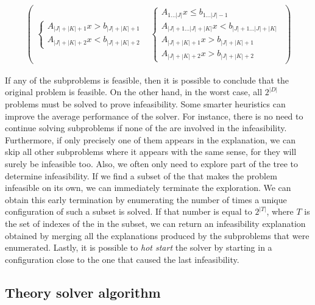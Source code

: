 \documentclass[runningheads]{llncs}
\begin{document}
\begin{equation}
\begin{gathered}
\begin{pmatrix}
\begin{cases}
                A_{|J| + |K| + 1} x > b_{|J| + |K| + 1}                   \\
                A_{|J| + |K| + 2} x < b_{|J| + |K| + 2}
            \end{cases}
             &
            \begin{cases}
                A_{1 \dots |J|} x \le b_{1 \dots |J| - 1}                 \\
                A_{|J| + 1\dots |J| + |K|} x < b_{|J| + 1\dots |J| + |K|} \\
                A_{|J| + |K| + 1} x > b_{|J| + |K| + 1}                   \\
                A_{|J| + |K| + 2} x > b_{|J| + |K| + 2}
            \end{cases}
        \end{pmatrix}
    \end{gathered}
\end{equation}

If any of the subproblems is feasible, then it is possible to conclude that the original problem is feasible.
On the other hand, in the worst case, all $2^{|D|}$ problems must be solved to prove infeasibility.
Some smarter heuristics can improve the average performance of the solver.
For instance, there is no need to continue solving subproblems if none of the \nqcs are involved in the infeasibility.
Furthermore, if only precisely one of them appears in the explanation, we can skip all other subproblems where it appears with the same sense, for they will surely be infeasible too.
Also, we often only need to explore part of the tree to determine infeasibility.
If we find a subset of the \nqc that makes the problem infeasible on its own, we can immediately terminate the exploration.
We can obtain this early termination by enumerating the number of times a unique configuration of such a subset is solved.
If that number is equal to $2^{|T|}$, where $T$ is the set of indexes of the \nqcs in the subset, we can return an infeasibility explanation obtained by merging all the explanations produced by the subproblems that were enumerated.
Lastly, it is possible to \textit{hot start} the solver by starting in a configuration close to the one that caused the last infeasibility.

\subsection{Theory solver algorithm}
\end{document}
